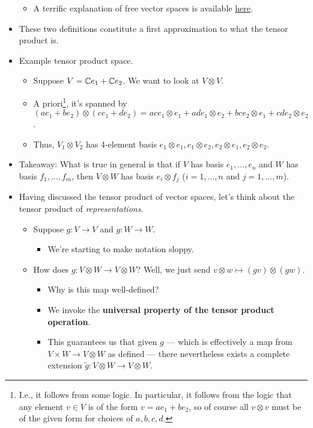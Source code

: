\documentclass[../notes.tex]{subfiles}
\begin{document}
\begin{itemize}
\begin{itemize}
        \item A terrific explanation of free vector spaces is available \href{https://math.stackexchange.com/questions/18315/free-vector-space-and-vector-space}{here}.
    \end{itemize}
    \item These two definitions constitute a first approximation to what the tensor product is.
    \item Example tensor product space.
    \begin{itemize}
        \item Suppose $V=\mathbb{C} e_1+\mathbb{C} e_2$. We want to look at $V\otimes V$.
        \item A priori\footnote{I.e., it follows from some logic. In particular, it follows from the logic that any element $v\in V$ is of the form $v=ae_1+be_2$, so of course all $v\otimes v$ must be of the given form for choices of $a,b,c,d$.}, it's spanned by $(ae_1+be_2)\otimes(ce_1+de_2)=ace_1\otimes e_1+ade_1\otimes e_2+bce_2\otimes e_1+cde_2\otimes e_2$.
        \item Thus, $V_1\otimes V_2$ has 4-element basis $e_1\otimes e_1,e_1\otimes e_2,e_2\otimes e_1,e_2\otimes e_2$.
    \end{itemize}
    \item Takeaway: What is true in general is that if $V$ has basis $e_1,\dots,e_n$ and $W$ has basis $f_1,\dots,f_m$, then $V\otimes W$ has basis $e_i\otimes f_j$ ($i=1,\dots,n$ and $j=1,\dots,m$).
    \item Having discussed the tensor product of vector spaces, let's think about the tensor product of \emph{representations}.
    \begin{itemize}
        \item Suppose $g:V\to V$ and $g:W\to W$.
        \begin{itemize}
            \item We're starting to make notation sloppy.
        \end{itemize}
        \item How does $g:V\otimes W\to V\otimes W$? Well, we just send $v\otimes w\mapsto(gv)\otimes(gw)$.
        \begin{itemize}
            \item Why is this map well-defined?
            \item We invoke the \textbf{universal property of the tensor product operation}.
            \item This guarantees us that given $g$ --- which is effectively a map from $V\times W\to V\otimes W$ as defined --- there nevertheless exists a complete extension $\tilde{g}:V\otimes W\to V\otimes W$.

\end{itemize}
\end{itemize}
\end{itemize}
\end{document}
